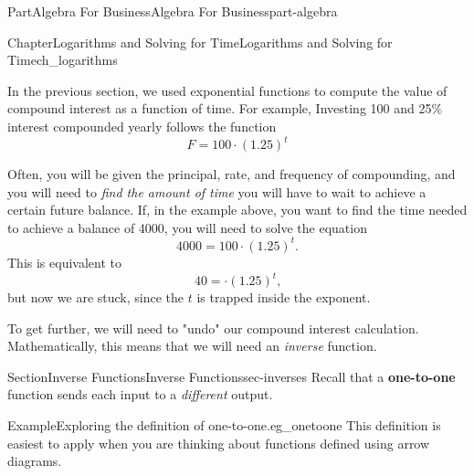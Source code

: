 \documentclass[oneside,10pt,]{tufte-book}
\newcommand{\terminology}[1]{\textbf{#1}}
\numberwithin{equation}{chapter}
\begin{document}
\begin{partptx}{Part}{Algebra For Business}{}{Algebra For Business}{}{}{part-algebra}
\typeout{************************************************}
%
\begin{chapterptx}{Chapter}{Logarithms and Solving for Time}{}{Logarithms and Solving for Time}{}{}{ch_logarithms}
\renewcommand*{\chaptername}{Chapter}
\begin{introduction}{}%
In the previous section, we used exponential functions to compute the value of compound interest as a function of time.  For example, Investing \textdollar{}100 and 25\% interest compounded yearly follows the function%
\begin{equation*}
F = 100\cdot (1.25)^t
\end{equation*}
%
\par
Often, you will be given the principal, rate, and frequency of compounding, and you will need to \emph{find the amount of time} you will have to wait to achieve a certain future balance.  If, in the example above, you want to find the time needed to achieve a balance of \textdollar{}4000, you will need to solve the equation%
\begin{equation*}
4000 = 100\cdot (1.25)^t\text{.}
\end{equation*}
This is equivalent to%
\begin{equation*}
40 = \cdot (1.25)^t\text{,}
\end{equation*}
but now we are stuck, since the \(t\) is trapped inside the exponent.%
\par
To get further, we will need to "undo" our compound interest calculation. Mathematically, this means that we will need an \emph{inverse} function.%
\end{introduction}%
%
%
\typeout{************************************************}
\typeout{************************************************}
%
\begin{sectionptx}{Section}{Inverse Functions}{}{Inverse Functions}{}{}{sec-inverses}
Recall that a \terminology{one-to-one} function sends each input to a \emph{different} output.%
\begin{example}{Example}{Exploring the definition of one-to-one.}{eg_onetoone}%
This definition is easiest to apply when you are thinking about functions defined using arrow diagrams.%
\begin{image}{0}{1}{0}{}%
\end{image}
\end{example}
\end{sectionptx}
\end{chapterptx}
\end{partptx}
\end{document}
